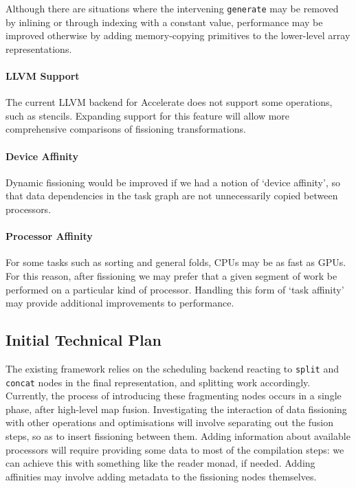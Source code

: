 \documentclass[a4paper,12pt]{article}
\newcommand{\icf}[1]{\mbox{\texttt{#1}}} %
\begin{document}
Although there are situations where the intervening \icf{generate} may be removed by inlining or through indexing with a constant value, performance may be improved otherwise by adding memory-copying primitives to the lower-level array representations.

\paragraph*{LLVM Support}
The current LLVM backend for Accelerate does not support some operations, such as stencils.
Expanding support for this feature will allow more comprehensive comparisons of fissioning transformations.

\paragraph*{Device Affinity}
Dynamic fissioning would be improved if we had a notion of `device affinity', so that data dependencies in the task graph are not unnecessarily copied between processors.

\paragraph*{Processor Affinity}
For some tasks such as sorting and general folds, CPUs may be as fast as GPUs.
For this reason, after fissioning we may prefer that a given segment of work be performed on a particular kind of processor.
Handling this form of `task affinity' may provide additional improvements to performance.

\subsection{Initial Technical Plan}
The existing framework relies on the scheduling backend reacting to \icf{split} and \icf{concat} nodes in the final representation, and splitting work accordingly.
Currently, the process of introducing these fragmenting nodes occurs in a single phase, after high-level map fusion.
Investigating the interaction of data fissioning with other operations and optimisations will involve separating out the fusion steps, so as to insert fissioning between them.
Adding information about available processors will require providing some data to most of the compilation steps: we can achieve this with something like the reader monad, if needed.
Adding affinities may involve adding metadata to the fissioning nodes themselves.
\end{document}
